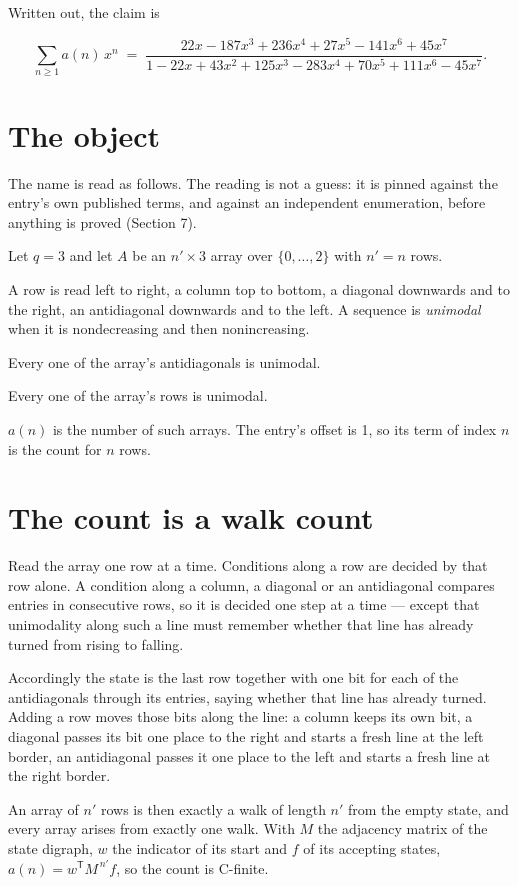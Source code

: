 \documentclass[11pt]{article}
\theoremstyle{definition}
\begin{document}
Written out, the claim is

\[\sum_{n \ge 1} a(n)\,x^n \;=\; \frac{22x - 187x^{3} + 236x^{4} + 27x^{5} - 141x^{6} + 45x^{7}}{1 - 22x + 43x^{2} + 125x^{3} - 283x^{4} + 70x^{5} + 111x^{6} - 45x^{7}}.\]

\section{The object}

The name is read as follows. The reading is not a guess: it is pinned against the entry's own published terms, and against an independent enumeration, before anything is proved (Section 7).

Let $q = 3$ and let $A$ be an $n' \times 3$ array over $\{0,\dots,2\}$ with $n' = n$ rows.

A row is read left to right, a column top to bottom, a diagonal downwards and to the right, an antidiagonal downwards and to the left. A sequence is {\itshape unimodal} when it is nondecreasing and then nonincreasing.

Every one of the array's antidiagonals is unimodal.

Every one of the array's rows is unimodal.

$a(n)$ is the number of such arrays. The entry's offset is 1, so its term of index $n$ is the count for $n$ rows.

\section{The count is a walk count}

Read the array one row at a time. Conditions along a row are decided by that row alone. A condition along a column, a diagonal or an antidiagonal compares entries in consecutive rows, so it is decided one step at a time --- except that unimodality along such a line must remember whether that line has already turned from rising to falling.

Accordingly the state is the last row together with one bit for each of the antidiagonals through its entries, saying whether that line has already turned. Adding a row moves those bits along the line: a column keeps its own bit, a diagonal passes its bit one place to the right and starts a fresh line at the left border, an antidiagonal passes it one place to the left and starts a fresh line at the right border.

An array of $n'$ rows is then exactly a walk of length $n'$ from the empty state, and every array arises from exactly one walk. With $M$ the adjacency matrix of the state digraph, $w$ the indicator of its start and $f$ of its accepting states, $a(n) = w^{\mathsf T}M^{\,n'}f$, so the count is C-finite.
\end{document}
